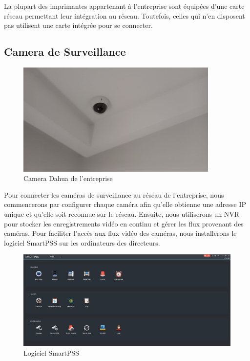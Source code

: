 La plupart des imprimantes appartenant à l'entreprise sont équipées d'une carte réseau permettant leur intégration au réseau. Toutefois, celles qui n'en disposent pas utilisent une carte intégrée pour se connecter. \\

\subsection{Camera de Surveillance}

\begin{figure}[H]
 \centering
    \includegraphics[width=10cm]{Images/BRades-CCTV.jpg}
    \caption{Camera Dahua de l'entreprise}
    \label{Chap4.2.3}
\end{figure}    
\smallskip




Pour connecter les caméras de surveillance au réseau de l'entreprise, nous commencerons par configurer chaque caméra afin qu'elle obtienne une adresse IP unique et qu'elle soit reconnue sur le réseau. Ensuite, nous utiliserons un NVR pour stocker les enregistrements vidéo en continu et gérer les flux provenant des caméras. Pour faciliter l'accès aux flux vidéo des caméras, nous installerons le logiciel SmartPSS sur les ordinateurs des directeurs. \\


\begin{figure}[H]
 \centering
    \includegraphics[width=15cm]{Images/SmartPSS-Logiciel.png}
    \caption{Logiciel SmartPSS}
    \label{Chap4.2.4}
\end{figure}    
\smallskip

